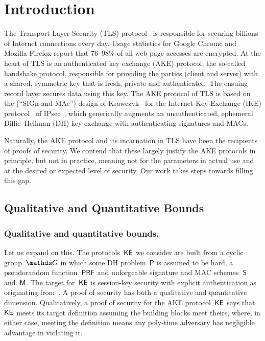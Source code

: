 \section{Introduction}
\label{sec:introduction}

The Transport Layer Security (TLS) protocol~\cite{rfc8446} is responsible for securing billions of Internet connections every day.
Usage statistics for Google Chrome%
and Mozilla Firefox%
report that $76$--$98$\% of all web page accesses are encrypted.%
At the heart of TLS is an authenticated key exchange (AKE) protocol, the so-called handshake protocol, responsible for providing the parties (client and server) with a shared, symmetric key that is fresh, private and authenticated.
The ensuing record layer secures data using this key.
The AKE protocol of TLS is based on the \SIGMA (``SIGn-and-MAc'') design of Krawczyk~\cite{C:Krawczyk03} for the Internet Key Exchange (IKE) protocol~\cite{rfc2409} of IPsec~\cite{rfc2401},
which generically augments an unauthenticated, ephemeral Diffie--Hellman (DH) key exchange with authenticating signatures and MACs.

Naturally, the \SIGMA AKE protocol and its incarnation in TLS have been the recipients of proofs of security.
We contend that these largely justify the AKE protocols in principle, but not in practice,
meaning not for the parameters in actual use and at the desired or expected level of security.
Our work takes steps towards filling this gap.


\iffull
\subsection{Qualitative and Quantitative Bounds}
\else
\subsubsection*{Qualitative and quantitative bounds.}
\fi

Let us expand on this.
The protocols~$\mathsf{KE}$ we consider are built from
a cyclic group~$\group$ in which some DH problem~$\mathsf{P}$ is assumed to be hard,
a pseudorandom function~$\mathsf{PRF}$ and unforgeable signature and MAC schemes~$\mathsf{S}$ and~$\mathsf{M}$.
The target for~$\mathsf{KE}$ is session-key security with explicit authentication as originating from~\cite{C:BelRog93,EC:BelPoiRog00,EC:CanKra01}.
A proof of security has both a qualitative and quantitative dimension.
Qualitatively, a proof of security for the AKE protocol~$\mathsf{KE}$ says that $\mathsf{KE}$ meets its target definition assuming the building blocks meet theirs,
where, in either case, meeting the definition means any poly-time adversary has negligible advantage in violating it.


